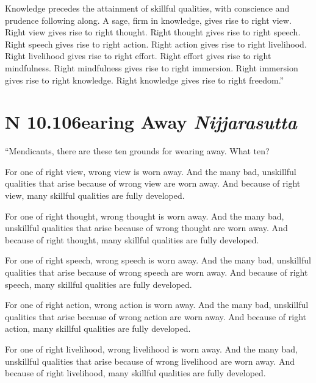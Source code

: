 \documentclass[12pt,openany]{book}%
\newcommand*{\suttatitleacronym}[1]{\smaller[2]{#1}\vspace*{.3em}}
\newcommand*{\suttatitletranslation}[1]{\linebreak{#1}}
\newcommand*{\suttatitleroot}[1]{\linebreak\smaller[2]\itshape{#1}}
\newcommand*{\tocacronym}[1]{\hspace*{-3.3em}{#1}\quad}
\newcommand*{\toctranslation}[1]{#1}
\newcommand*{\tocroot}[1]{(\textit{#1})}
\begin{document}
Knowledge precedes the attainment of skillful qualities, with conscience and prudence following along. A sage, firm in knowledge, gives rise to right view. Right view gives rise to right thought. Right thought gives rise to right speech. Right speech gives rise to right action. Right action gives rise to right livelihood. Right livelihood gives rise to right effort. Right effort gives rise to right mindfulness. Right mindfulness gives rise to right immersion. Right immersion gives rise to right knowledge. Right knowledge gives rise to right freedom.” 

%
\section*{{\suttatitleacronym AN 10.106}{\suttatitletranslation Wearing Away }{\suttatitleroot Nijjarasutta}}
\addcontentsline{toc}{section}{\tocacronym{AN 10.106} \toctranslation{Wearing Away } \tocroot{Nijjarasutta}}

“Mendicants, there are these ten grounds for wearing away. What ten? 

For one of right view, wrong view is worn away. And the many bad, unskillful qualities that arise because of wrong view are worn away. And because of right view, many skillful qualities are fully developed. 

For one of right thought, wrong thought is worn away. And the many bad, unskillful qualities that arise because of wrong thought are worn away. And because of right thought, many skillful qualities are fully developed. 

For one of right speech, wrong speech is worn away. And the many bad, unskillful qualities that arise because of wrong speech are worn away. And because of right speech, many skillful qualities are fully developed. 

For one of right action, wrong action is worn away. And the many bad, unskillful qualities that arise because of wrong action are worn away. And because of right action, many skillful qualities are fully developed. 

For one of right livelihood, wrong livelihood is worn away. And the many bad, unskillful qualities that arise because of wrong livelihood are worn away. And because of right livelihood, many skillful qualities are fully developed. 
\end{document}
